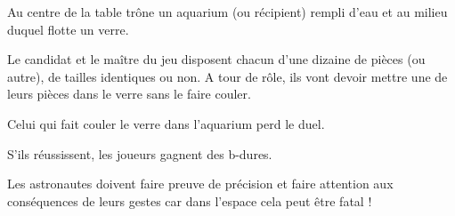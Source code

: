 \documentclass{grand-jeu}
\begin{document}
\begin{liste-materiel}
\end{liste-materiel}

\begin{regles}
Au centre de la table trône un aquarium (ou récipient) rempli d'eau et au milieu duquel flotte un verre.

Le candidat et le maître du jeu disposent chacun d'une dizaine de pièces (ou autre), de tailles identiques ou non. A tour de rôle, ils vont devoir mettre une de leurs pièces dans le verre sans le faire couler. 

Celui qui fait couler le verre dans l'aquarium perd le duel.

S’ils réussissent, les joueurs gagnent des b-dures. 
\end{regles}

\begin{imaginaire}
Les astronautes doivent faire preuve de précision et faire attention aux conséquences de leurs gestes car dans l'espace cela peut être fatal ! 
\end{imaginaire}

\begin{moments-stop}
\end{moments-stop}
\end{document}
